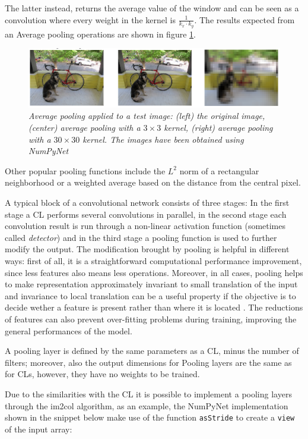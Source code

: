 \documentclass[12pt,a4paper]{report}
\begin{document}
The latter instead, returns the average value of the window and can be seen as a convolution where every weight in the kernel is $\frac{1}{k_x \cdot k_y}$.
The results expected from an Average pooling operations are shown in figure \ref{fig:avgpool:ex}.

\begin{figure}[h]
 \centering
 \includegraphics[scale=0.7]{./images/avgpool_layer.png}
 \caption{\it Average pooling applied to a test image: (left) the original image, (center) average pooling with a $3 \times 3$ kernel, (right) average pooling with a $30 \times 30$ kernel. The images have been obtained using NumPyNet}
 \label{fig:avgpool:ex}
\end{figure}

Other popular pooling functions include the $L^2$ norm of a rectangular neighborhood or a weighted average based on the distance from the central pixel.

A typical block of a convolutional network consists of three stages: In the first stage a CL performs several convolutions in parallel, in the second stage each convolution result is run through a non-linear activation function (sometimes called {\it detector}) and in the third stage a pooling function is used to further modify the output. 
The modification brought by pooling is helpful in different ways: first of all, it is a straightforward computational performance improvement, since less features also means less operations. 
Moreover, in all cases, pooling helps to make representation approximately invariant to small translation of the input and invariance to local translation can be a useful property if the objective is to decide wether a feature is present rather than where it is located \cite{Goodfellow-et-al-2016}.
The reductions of features can also prevent over-fitting problems during training, improving the general performances of the model. 

A pooling layer is defined by the same parameters as a CL, minus the number of filters; moreover, also the output dimensions for Pooling layers are the same as for CLs, however, they have no weights to be trained.

Due to the similarities with the CL it is possible to implement a pooling layers through the im2col algorithm, as an example, the NumPyNet implementation shown in the snippet below make use of the function \texttt{asStride} to create a \texttt{view} of the input array: 
\end{document}
